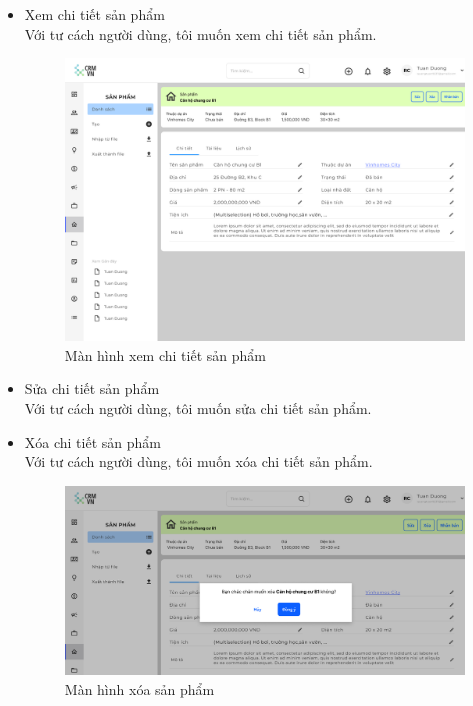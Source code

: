 \documentclass[12pt,a4paper]{article}
\begin{document}
\begin{enumerate}
\begin{itemize}
            \item Xem chi tiết sản phẩm \\
            Với tư cách người dùng, tôi muốn xem chi tiết sản phẩm.

            \begin{figure}[H]
                \centering \includegraphics[width=\textwidth]{Img/Nguyet/Sanpham/chitiet.png}
                \vspace{0.5cm}
                \caption{Màn hình xem chi tiết sản phẩm }
                \label{ctsp}
            \end{figure}

            \item Sửa chi tiết sản phẩm \\
            Với tư cách người dùng, tôi muốn sửa chi tiết sản phẩm.

            \item Xóa chi tiết sản phẩm \\
            Với tư cách người dùng, tôi muốn xóa chi tiết sản phẩm.

            \begin{figure}[H]
                \centering \includegraphics[width=\textwidth]{Img/Nguyet/Sanpham/xoa.png}
                \vspace{0.5cm}
                \caption{Màn hình xóa sản phẩm }
                \label{xóa}
            \end{figure}


\end{itemize}
\end{enumerate}
\end{document}
